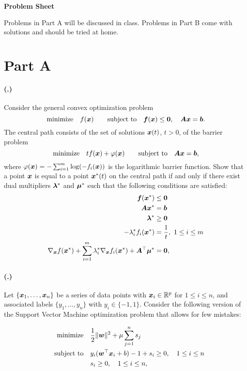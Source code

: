 \documentclass{article}
\newcounter{problemSheetNumber}
\newcounter{problems}
\renewcommand{\problem}{\paragraph{(\theproblemSheetNumber.\theproblems)}\addtocounter{problems}{1}}
\begin{document}
 
\begin{center}
{\Large {\bf Problem Sheet \theproblemSheetNumber}}
\end{center}

Problems in Part A will be discussed in class. Problems in Part B come with solutions and should be tried at home. 


\section*{Part A}


\problem Consider the general convex optimization problem
\begin{equation*}
 \text{minimize}\quad f(\bm{x})\quad \quad\text{subject to}\quad \bm{f}(\bm{x})\leq \bm{0},\quad \bm{A}\bm{x} = \bm{b}.
\end{equation*}
The central path consists of the set of solutions $\bm{x}(t)$, $t>0$, of the barrier problem
\begin{equation*}
\text{minimize}\quad  tf(\bm{x})+\varphi(\bm{x})\quad
\quad\text{subject to}\quad  \bm{A}\bm{x}=\bm{b},
\end{equation*}
where $\varphi(\bm{x}) = -\sum_{i=1}^m \log(-f_i(\bm{x}))$ is the logarithmic barrier function.
Show that a point $\bm{x}$ is equal to a point $\bm{x}^*(t)$ on the central path if and only if there exist dual multipliers $\bm{\lambda}^*$ and $\bm{\mu}^*$ such that the following conditions are satisfied:
 \begin{align*}
\begin{split}
  \bm{f}(\bm{x}^*) & \leq \bm{0}\\
  \bm{A}\bm{x}^* & = \bm{b}\\
  \bm{\lambda}^*&\geq \bm{0}\\
  -\lambda_i^*f_i(\bm{x}^*) & =\frac{1}{t}, \ 1\leq i\leq m\\
  \nabla_{\bm{x}} f(\bm{x}^*)+\sum_{i=1}^m \lambda_i^* \nabla_{\bm{x}}f_i(\bm{x}^*)+\bm{A}^{\top}\bm{\mu}^* &= \bm{0},
 \end{split}
 \end{align*}
 
\problem Let $\{\bm{x}_1,\dots,\bm{x}_n\}$ be a series of data points with $\bm{x}_i\in \mathbb{R}^p$ for $1\leq i\leq n$, and associated labels $\{y_1,\dots,y_n\}$ with $y_i\in \{-1,1\}$. Consider the following version of the Support Vector Machine optimization problem 
that allows for few mistakes:

\begin{align*}
\text{minimize}\quad &\frac{1}{2}\Vert {\bm{w}}\Vert^2+\mu\sum_{j=1}^n s_j\\
\quad\text{subject to}\quad & y_i(\bm{w}^{\top}\bm{x}_i+b)-1+s_i \geq 0, \quad 1\leq i\leq n\\
& s_i\geq 0, \quad 1\leq i\leq n,
\end{align*}
\end{document}
